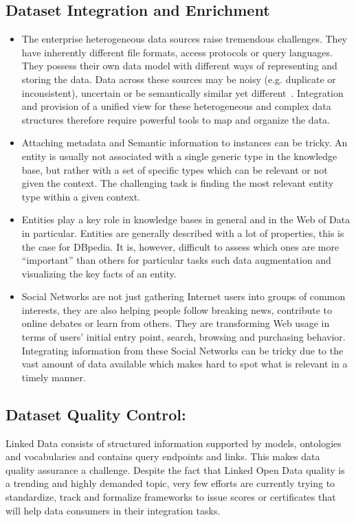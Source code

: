 \subsection{Dataset Integration and Enrichment}
\begin{itemize}
	\item The enterprise heterogeneous data sources raise tremendous challenges. They have inherently different file formats, access protocols or query languages. They possess their own data model with different ways of representing and storing the data. Data across these sources may be noisy (e.g. duplicate or inconsistent), uncertain or be semantically similar yet different~\cite{Avitha:EuroJorunal:11}. Integration and provision of a unified view for these heterogeneous and complex data structures therefore require powerful tools to map and organize the data.
	\item Attaching metadata and Semantic information to instances can be tricky. An entity is usually not associated with a single generic type in the knowledge base, but rather with a set of specific types which can be relevant or not given the context. The challenging task is finding the most relevant entity type within a given context.
	\item Entities play a key role in knowledge bases in general and in the Web of Data in particular. Entities are generally described with a lot of properties, this is the case for DBpedia. It is, however, difficult to assess which ones are more ``important'' than others for particular tasks such data augmentation and visualizing the key facts of an entity.
	\item Social Networks are not just gathering Internet users into groups of common interests, they are also helping people follow breaking news, contribute to online debates or learn from others. They are transforming Web usage in terms of users' initial entry point, search, browsing and purchasing behavior. Integrating information from these Social Networks can be tricky due to the vast amount of data available which makes hard to spot what is relevant in a timely manner.
\end{itemize}

\subsection{Dataset Quality Control:} Linked Data consists of structured information supported by models, ontologies and vocabularies and contains query endpoints and links. This makes data quality assurance a challenge. Despite the fact that Linked Open Data quality is a trending and highly demanded topic, very few efforts are currently trying to standardize, track and formalize frameworks to issue scores or certificates that will help data consumers in their integration tasks.

